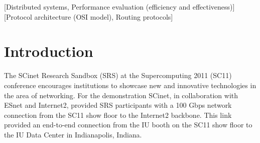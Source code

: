 \documentclass[]{sigplan-proc}
\begin{document}
\begin{abstract}

  As part of the SCinet Research Sandbox at the Supercomputing 2011 conference, Indiana University utilized a
  dedicated 100 Gbps wide area network (WAN) link spanning more than 3,500 km (2,175 mi) to demonstrate the
  capabilities of the Lustre high performance parallel file system in a high bandwidth, high latency WAN
  environment. This demonstration functioned as a proof of concept and provided an opportunity to study
  Lustre's performance over a 100 Gbps WAN. To characterize the performance of the network and file system a
  series of benchmarks and tests were undertaken. These included low level iperf network tests, Lustre
  networking (LNET) tests, file system tests with the IOR benchmark, and a suite of real-world applications reading
  and writing to the file system. All of the tests and benchmarks were run over a the WAN link with a latency
  of 50.5 ms. In this article we describe the configuration and constraints of the demonstration and focus in
  on the key findings and discoveries made regarding the Lustre networking layer for this extremely high
  bandwidth and high latency connection. Of particular interest is the relationship between the {\tt peer\_credits}
  and {\tt max\_rpcs\_in\_flight} settings when considering LNET performance.

\end{abstract}

[Distributed systems, Performance evaluation (efficiency and effectiveness)]
[Protocol architecture (OSI model),
Routing protocols]



\section{Introduction}\label{sec:intro}

The SCinet Research Sandbox (SRS) at the Supercomputing 2011 (SC11) conference encourages institutions to
showcase new and innovative technologies in the area of networking. For the demonstration SCinet, in
collaboration with ESnet and Internet2, provided SRS participants with a 100 Gbps network connection from
the SC11 show floor to the Internet2 backbone. This link provided an end-to-end connection from the IU booth
on the SC11 show floor to the IU Data Center in Indianapolis, Indiana. 
\end{document}
